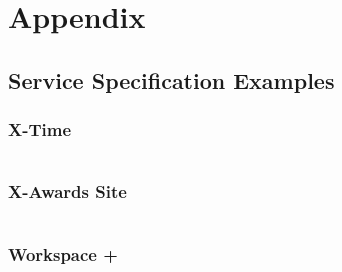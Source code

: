 \documentclass{cshonours}
\begin{document}
\printbibliography[title=References]

\pagebreak
\chapter{Appendix}
\section{Service Specification Examples}
\label{dslexamples}

\subsection{X-Time}
\label{dslgem}
\inputminted[fontfamily=fi4]{ruby}{appendices/x-time.rb}

\subsection{X-Awards Site}
\inputminted[fontfamily=fi4]{ruby}{appendices/x-awards-site.rb}

\subsection{Workspace +}
\inputminted[fontfamily=fi4]{ruby}{appendices/workspace.rb}
\end{document}
